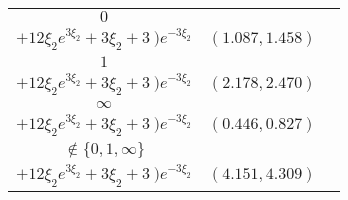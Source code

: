 {\begin{tabularx}{\textwidth}{|c|c|c}
\midrule
\(0\) & \begin{tabular}{l} \(\frac{1}{3\xi_2^{4}} \cdot
 ( \ (2   \xi_2^{3} - 3   \xi_2 - 3) e^{4   \xi_2} \)   \\ \hspace{2cm} \(+12 \xi_2 e^{3 \xi_2} + 3 \xi_2 + 3 \ ) e^{-3 \xi_2}\) \end{tabular} & \((1.087,1.458)\) \\ \midrule
\(1\) & \begin{tabular}{l} \(\frac{1}{3\xi_2^{4}} \cdot
 ( \ (2   \xi_2^{3} - 3   \xi_2 - 3) e^{4   \xi_2} \)   \\ \hspace{2cm} \(+12 \xi_2 e^{3 \xi_2} + 3 \xi_2 + 3 \ ) e^{-3 \xi_2}\) \end{tabular} & \((2.178,2.470)\) \\ \midrule
\(\infty\) & \begin{tabular}{l} \(\frac{1}{3\xi_2^{4}} \cdot
 ( \ (2   \xi_2^{3} - 3   \xi_2 - 3) e^{4   \xi_2} \)   \\ \hspace{2cm} \(+12 \xi_2 e^{3 \xi_2} + 3 \xi_2 + 3 \ ) e^{-3 \xi_2}\) \end{tabular} & \((0.446,0.827)\) \\ \midrule
\(\notin \{0,1,\infty\}\) & \begin{tabular}{l} \(\frac{1}{3\xi_2^{4}} \cdot
 ( \ (2   \xi_2^{3} - 3   \xi_2 - 3) e^{4   \xi_2} \)   \\ \hspace{2cm} \(+12 \xi_2 e^{3 \xi_2} + 3 \xi_2 + 3 \ ) e^{-3 \xi_2}\) \end{tabular} & \((4.151,4.309)\) \\
 \bottomrule
\end{tabularx}
\newpage
%
%
%
%
%
%
%
%
\begin{figure}[H]
\centering
\label{fig:data318}
\end{figure}}

